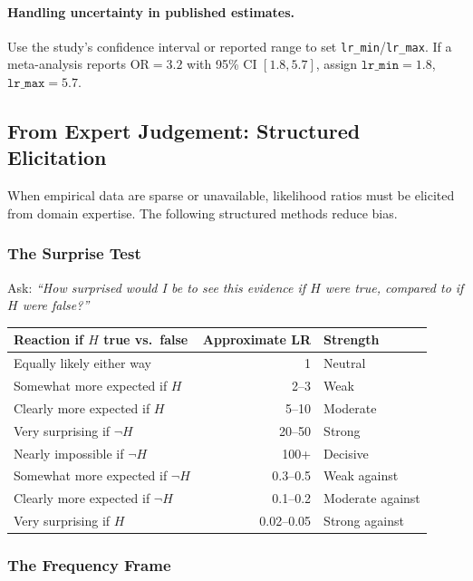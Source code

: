 \documentclass[11pt,a4paper]{article}
\begin{document}
\paragraph{Handling uncertainty in published estimates.}
Use the study's confidence interval or reported range to set
\texttt{lr\_min}/\texttt{lr\_max}. If a meta-analysis reports
$\text{OR} = 3.2$ with 95\% CI $[1.8, 5.7]$, assign
$\texttt{lr\_min} = 1.8$, $\texttt{lr\_max} = 5.7$.

\subsection{From Expert Judgement: Structured Elicitation}

When empirical data are sparse or unavailable, likelihood ratios must be
elicited from domain expertise. The following structured methods reduce bias.

\subsubsection{The Surprise Test}

Ask: \emph{``How surprised would I be to see this evidence if $H$ were true,
compared to if $H$ were false?''}

\begin{center}
\begin{tabular}{lrl}
\hline
\textbf{Reaction if $H$ true vs.\ false} & \textbf{Approximate LR} & \textbf{Strength}\\
\hline
Equally likely either way & 1 & Neutral \\
Somewhat more expected if $H$ & 2--3 & Weak \\
Clearly more expected if $H$ & 5--10 & Moderate \\
Very surprising if $\neg H$ & 20--50 & Strong \\
Nearly impossible if $\neg H$ & 100+ & Decisive \\
\hline
Somewhat more expected if $\neg H$ & 0.3--0.5 & Weak against \\
Clearly more expected if $\neg H$ & 0.1--0.2 & Moderate against \\
Very surprising if $H$ & 0.02--0.05 & Strong against \\
\hline
\end{tabular}
\end{center}

\subsubsection{The Frequency Frame}
\end{document}

